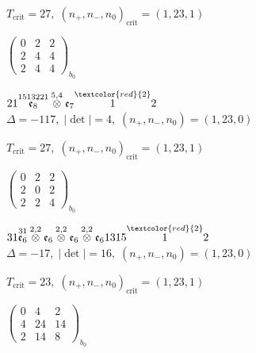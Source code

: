 \documentclass[10pt]{article}
\begin{document}
\hspace{1em}$T_{\text{crit}}=27,\; (n_+,n_-,n_0)_{\text{crit}}=(1,23,1)$

\hspace{2em}$\left(\begin{smallmatrix}0 & 2 & 2 \\ 2 & 4 & 4 \\ 2 & 4 & 4\end{smallmatrix}\right)_{\!b_0}$

\smallskip

$21\overset{1513221}{\mathfrak{e}_8}\overset{5,4}{\otimes}\mathfrak{e}_7\overset{\textcolor{red}{2}}{1}2$ \quad $\Delta=-117,\; |\det|=4,\; (n_+,n_-,n_0)=(1,23,0)$

\hspace{1em}$T_{\text{crit}}=27,\; (n_+,n_-,n_0)_{\text{crit}}=(1,23,1)$

\hspace{2em}$\left(\begin{smallmatrix}0 & 2 & 2 \\ 2 & 0 & 2 \\ 2 & 2 & 4\end{smallmatrix}\right)_{\!b_0}$

\smallskip

$31\overset{31}{\mathfrak{e}_6}\overset{2,2}{\otimes}\mathfrak{e}_6\overset{2,2}{\otimes}\mathfrak{e}_6\overset{2,2}{\otimes}\mathfrak{e}_61315\overset{\textcolor{red}{2}}{1}2$ \quad $\Delta=-17,\; |\det|=16,\; (n_+,n_-,n_0)=(1,23,0)$

\hspace{1em}$T_{\text{crit}}=23,\; (n_+,n_-,n_0)_{\text{crit}}=(1,23,1)$

\hspace{2em}$\left(\begin{smallmatrix}0 & 4 & 2 \\ 4 & 24 & 14 \\ 2 & 14 & 8\end{smallmatrix}\right)_{\!b_0}$

\smallskip
\end{document}
